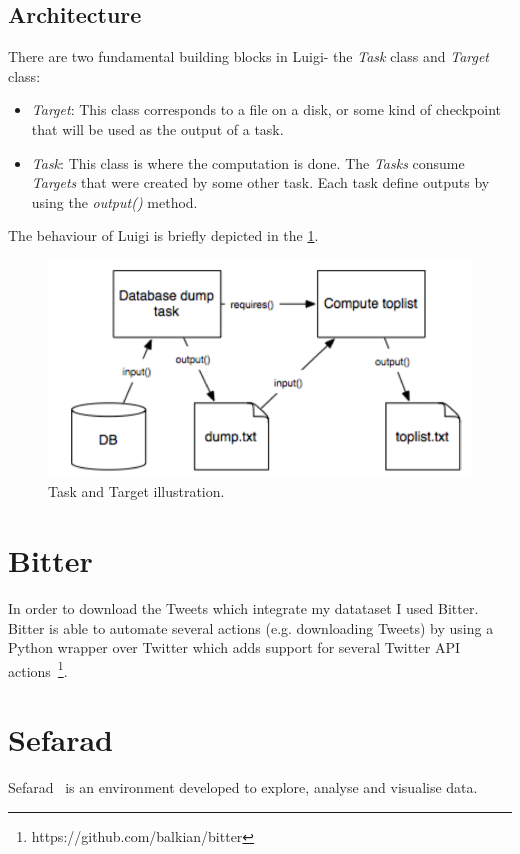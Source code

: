 \subsection{Architecture}
There are two fundamental building blocks in Luigi- the \textit{Task} class and \textit{Target} class:
\begin{itemize}
	\item \textit{Target}: This class corresponds to a file on a disk, or some kind of checkpoint that will be used as the output of a task.
	\item \textit{Task}: This class is where the computation is done. The \textit{Tasks} consume \textit{Targets} that were created by some other task. Each task define outputs by using the \textit{output()} method. 
\end{itemize}
The behaviour of Luigi is briefly depicted in the \cref{fig:luigytask}.
\begin{figure}
	\includegraphics[width=\linewidth]{img/luigi_tasks.png}
	\caption{Task and Target illustration.~\cite{luigi}}
	\label{fig:luigytask}
\end{figure}
\section{Bitter}
In order to download the Tweets which integrate my datataset I used Bitter. Bitter is able to automate several actions (e.g. downloading Tweets) by using a Python wrapper over Twitter which adds support for several Twitter API actions~\footnote{https://github.com/balkian/bitter}.
\section{Sefarad}
Sefarad~\cite{sefarad} is an environment developed to explore, analyse and visualise data. 

